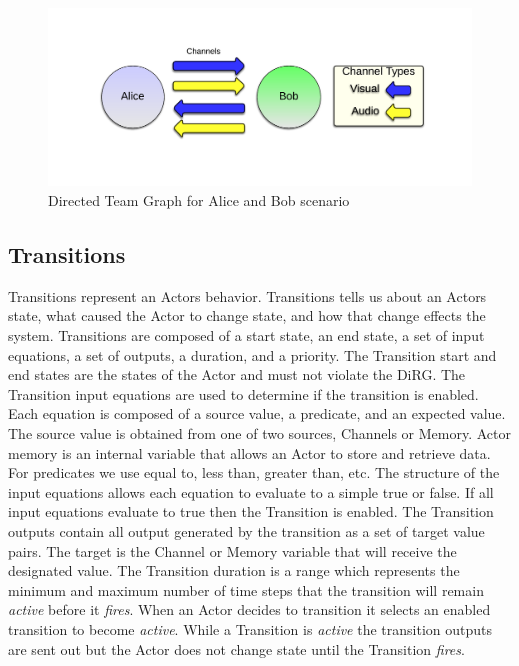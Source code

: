 \begin{figure}[h]
\begin{center}
\includegraphics[width=\textwidth]{ab_ditg.png}
\caption{Directed Team Graph for Alice and Bob scenario}
\label{fig:ab_ditg}
\end{center}
\end{figure}

\subsection{Transitions}
Transitions represent an Actors behavior.  Transitions tells us about an Actors state, what caused the Actor to change state, and how that change effects the system.  Transitions are composed of a start state, an end state, a set of input equations, a set of outputs, a duration, and a priority.  The Transition start and end states are the states of the Actor and must not violate the DiRG.  The Transition input equations are used to determine if the transition is enabled.  Each equation is composed of a source value, a predicate, and an expected value.  The source value is obtained from one of two sources, Channels or Memory.  Actor memory is an internal variable that allows an Actor to store and retrieve data.  For predicates we use equal to, less than, greater than, etc.  The structure of the input equations allows each equation to evaluate to a simple true or false.  If all input equations evaluate to true then the Transition is enabled.  The Transition outputs contain all output generated by the transition as a set of target value pairs.  The target is the Channel or Memory variable that will receive the designated value.  The Transition duration is a range which represents the minimum and maximum number of time steps that the transition will remain {\em active} before it {\em fires}.  When an Actor decides to transition it selects an enabled transition to become {\em active}.  While a Transition is {\em active} the transition outputs are sent out but the Actor does not change state until the Transition {\em fires}.




